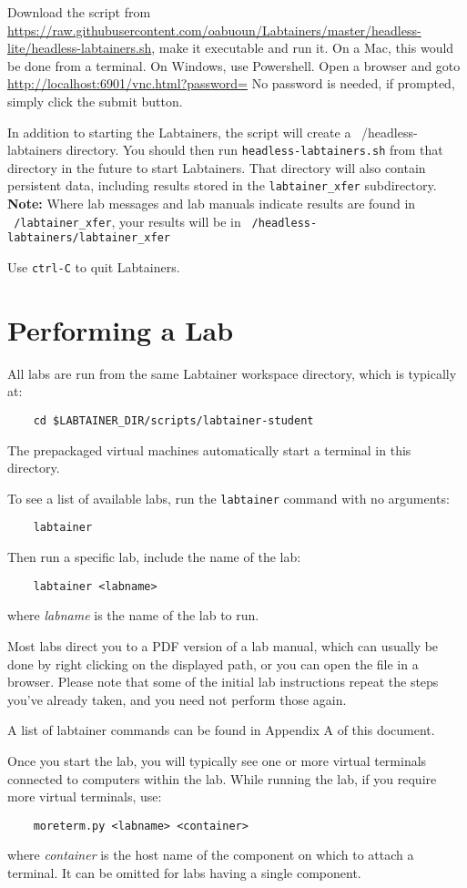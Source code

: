 \documentclass[12pt]{article}
\begin{document}
Download the script from \url{https://raw.githubusercontent.com/oabuoun/Labtainers/master/headless-lite/headless-labtainers.sh},
make it executable and run it.  On a Mac, this would be done from a terminal.  On Windows, use Powershell.
Open a browser and goto \url{http://localhost:6901/vnc.html?password=}
No password is needed, if prompted, simply click the submit button.

In addition to starting the Labtainers, the script will create a ~/headless-labtainers directory.  You should then run
{\tt headless-labtainers.sh} from that directory in the future to start Labtainers.  That directory will also contain persistent data, including
results stored in the {\tt labtainer\_xfer} subdirectory.  \textbf{Note:} Where lab messages and lab manuals indicate 
results are found in {\tt ~/labtainer\_xfer}, your results will be in {\tt ~/headless-labtainers/labtainer\_xfer}

Use {\tt ctrl-C} to quit Labtainers. 

\section{Performing a Lab}
\label{performing}
All labs are run from the same Labtainer workspace directory, which is typically at:
\begin{verbatim}
    cd $LABTAINER_DIR/scripts/labtainer-student
\end{verbatim}
\noindent The prepackaged virtual machines automatically start a terminal in this directory.

To see a list of available labs, run the {\tt labtainer} command with no arguments:
\begin{verbatim}
    labtainer 
\end{verbatim}
Then run a specific lab, include the name of the lab:
\begin{verbatim}
    labtainer <labname>
\end{verbatim}
\noindent where \textit{labname} is the name of the lab to run.  

Most labs direct you to a PDF version of a lab manual, which can usually 
be done by right clicking on the displayed path, or you can open the file in a browser.
Please note that some of the initial lab instructions repeat the steps you've already taken, and you need
not perform those again. 

A list of labtainer commands can be found in Appendix A of this document. 

Once you start the lab, you will typically see one or more virtual terminals connected to computers within
the lab.  While running the lab, if you require more virtual terminals, use:
\begin{verbatim}
    moreterm.py <labname> <container>
\end{verbatim}
\noindent where \textit{container} is the host name of the component on which to attach a terminal.  
It can be omitted for labs having a single component.
\end{document}
